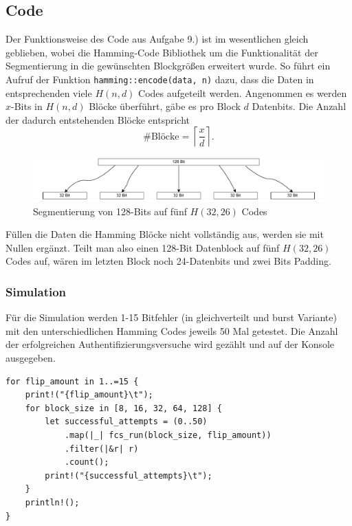 \documentclass{article}
\begin{document}
    \subsection{Code}
    Der Funktionsweise des Code aus Aufgabe 9.) ist im wesentlichen gleich geblieben, wobei die Hamming-Code Bibliothek um die 
    Funktionalität der Segmentierung in die gewünschten Blockgrößen erweitert wurde. So führt ein Aufruf
    der Funktion \verb|hamming::encode(data, n)| dazu, dass die Daten in entsprechenden viele $H(n,d)$ Codes
    aufgeteilt werden. Angenommen es werden $x$-Bits in $H(n,d)$ Blöcke überführt, gäbe es pro Block $d$ Datenbits.
    Die Anzahl der dadurch entstehenden Blöcke entspricht
    \begin{equation} \label{eq:1}
        \#\text{Blöcke}=\left\lceil\frac{x}{d}\right\rceil.
    \end{equation}
    \begin{figure}[h]
        \includegraphics[width=\textwidth]{img/segmentation.pdf}
        \caption{Segmentierung von 128-Bits auf fünf $H(32,26)$ Codes}
        \label{fig:segmentation}
    \end{figure}
    Füllen die Daten die Hamming Blöcke nicht vollständig aus, werden sie mit Nullen ergänzt. Teilt man also einen
    128-Bit Datenblock auf fünf $H(32,26)$ Codes auf, wären im letzten Block noch 24-Datenbits und zwei Bits Padding.\newline
    
    \subsubsection{Simulation}
    Für die Simulation werden 1-15 Bitfehler (in gleichverteilt und burst Variante) mit den unterschiedlichen
    Hamming Codes jeweils 50 Mal getestet. Die Anzahl der erfolgreichen Authentifizierungsversuche wird gezählt und auf
    der Konsole ausgegeben.
    \begin{verbatim}
for flip_amount in 1..=15 {
    print!("{flip_amount}\t");
    for block_size in [8, 16, 32, 64, 128] {
        let successful_attempts = (0..50)
            .map(|_| fcs_run(block_size, flip_amount))
            .filter(|&r| r)
            .count();
        print!("{successful_attempts}\t");
    }
    println!();
}
    \end{verbatim}
\end{document}
